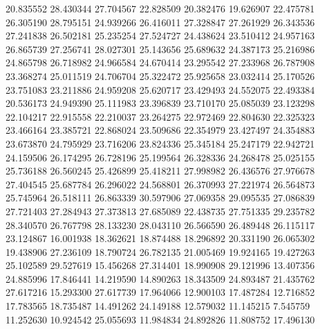 20.835552
28.430344
27.704567
22.828509
20.382476
19.626907
22.475781
26.305190
28.795151
24.939266
26.416011
27.328847
27.261929
26.343536
27.241838
26.502181
25.235254
27.524727
24.438624
23.510412
24.957163
26.865739
27.256741
28.027301
25.143656
25.689632
24.387173
25.216986
24.865798
26.718982
24.966584
24.670414
23.295542
27.233968
26.787908
23.368274
25.011519
24.706704
25.322472
25.925658
23.032414
25.170526
23.751083
23.211886
24.959208
25.620717
23.429493
24.552075
22.493384
20.536173
24.949390
25.111983
23.396839
23.710170
25.085039
23.123298
22.104217
22.915558
22.210037
23.264275
22.972469
22.804630
22.325323
23.466164
23.385721
22.868024
23.509686
22.354979
23.427497
24.354883
23.673870
24.795929
23.716206
23.824336
25.345184
25.247179
22.942721
24.159506
26.174295
26.728196
25.199564
26.328336
24.268478
25.025155
25.736188
26.560245
25.426899
25.418211
27.998982
26.436576
27.976678
27.404545
25.687784
26.296022
24.568801
26.370993
27.221974
26.564873
25.745964
26.518111
26.863339
30.597906
27.069358
29.095535
27.086839
27.721403
27.284943
27.373813
27.685089
22.438735
27.751335
29.235782
28.340570
26.767798
28.133230
28.043110
26.566590
26.489448
26.115117
23.124867
16.001938
18.362621
18.874488
18.296892
20.331190
26.065302
19.438906
27.236109
18.790724
26.782135
21.005469
19.924165
19.427263
25.102589
29.527619
15.456268
27.314401
18.990908
29.121996
13.407356
24.885996
17.846441
14.219590
14.890263
18.343509
24.893487
21.435762
27.617216
15.293300
27.617739
17.964066
12.900103
17.487284
12.716852
17.783565
18.735487
14.491262
24.149188
12.579032
11.145215
7.545759
11.252630
10.924542
25.055693
11.984834
24.892826
11.808752
17.496130
